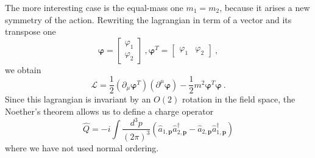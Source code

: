    The more interesting case is the equal-mass one $m_1 = m_2$, because it arises a new symmetry of the action. Rewriting the lagrangian in term of a vector and its transpose one
    \begin{equation*}
        \boldsymbol \varphi = \begin{bmatrix}
            \varphi_1 \\ \varphi_2
        \end{bmatrix} ~, \boldsymbol \varphi^T = \begin{bmatrix}
            \varphi_1 & \varphi_2
        \end{bmatrix} ~,
    \end{equation*}
    we obtain 
    \begin{equation*}
        \mathcal L = \frac{1}{2} (\partial_\mu \boldsymbol \varphi^T) (\partial^\mu \boldsymbol \varphi) - \frac{1}{2} m^2 \boldsymbol \varphi^T \boldsymbol \varphi ~.
    \end{equation*}
    Since this lagrangian is invariant by an $O(2)$ rotation in the field space, the Noether's theorem allows us to define a charge operator
    \begin{equation*}
        \hat Q = - i \int \frac{d^3 p}{(2\pi)^3} (\hat a_{1, \mathbf p} \hat a_{2, \mathbf p}^\dagger - \hat a_{2, \mathbf p} \hat a_{1, \mathbf p}^\dagger)
    \end{equation*}
    where we have not used normal ordering. 
